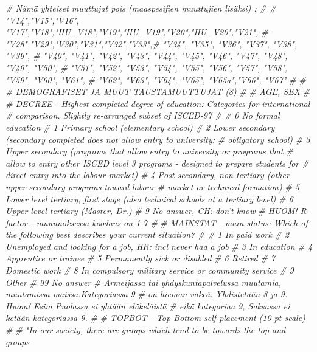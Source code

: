 \documentclass[
  finnish,
]{book}
\newenvironment{Shaded}{\begin{snugshade}}{\end{snugshade}}
\newcommand{\CommentTok}[1]{\textcolor[rgb]{0.56,0.35,0.01}{\textit{#1}}}
\begin{document}
\begin{Shaded}
\begin{Highlighting}[]
{\CommentTok{# Nämä yhteiset muuttujat pois (maaspesifien muuttujien lisäksi) :}
\CommentTok{#}
\CommentTok{# "V14","V15","V16",  "V17","V18","HU_V18","V19","HU_V19","V20","HU_V20","V21",}
\CommentTok{# "V28","V29","V30","V31","V32","V33",# "V34", "V35", "V36", "V37", "V38", "V39",}
\CommentTok{# "V40", "V41", "V42", "V43", "V44", "V45", "V46", "V47", "V48", "V49", "V50", }
\CommentTok{# "V51", "V52", "V53", "V54", "V55", "V56", "V57", "V58", "V59", "V60", "V61", }
\CommentTok{# "V62", "V63", "V64", "V65", "V65a","V66", "V67"}
\CommentTok{#}
\CommentTok{#}
\CommentTok{# DEMOGRAFISET JA MUUT TAUSTAMUUTTUJAT (8)}
\CommentTok{#}
\CommentTok{# AGE, SEX}
\CommentTok{#}
\CommentTok{# DEGREE - Highest completed degree of education: Categories for international}
\CommentTok{# comparison. Slightly re-arranged subset of ISCED-97}
\CommentTok{#}
\CommentTok{# 0 No formal education}
\CommentTok{# 1 Primary school (elementary school)}
\CommentTok{# 2 Lower secondary (secondary completed does not allow entry to university:}
\CommentTok{#  obligatory school)}
\CommentTok{# 3 Upper secondary (programs that allow entry to university or programs that}
\CommentTok{#  allow to entry other ISCED level 3 programs - designed to prepare students for}
\CommentTok{#  direct entry into the labour market)}
\CommentTok{# 4 Post secondary, non-tertiary (other upper secondary programs toward labour}
\CommentTok{#  market or technical formation)}
\CommentTok{# 5 Lower level tertiary, first stage (also technical schools at a tertiary level)}
\CommentTok{# 6 Upper level tertiary (Master, Dr.)}
\CommentTok{# 9 No answer, CH: don't know}
\CommentTok{# HUOM! R-factor - muunnoksessa koodaus on 1-7}
\CommentTok{#}
\CommentTok{# MAINSTAT - main status: Which of the following best describes your current situation?}
\CommentTok{#}
\CommentTok{# 1 In paid work}
\CommentTok{# 2 Unemployed and looking for a job, HR: incl never had a job}
\CommentTok{# 3 In education}
\CommentTok{# 4 Apprentice or trainee}
\CommentTok{# 5 Permanently sick or disabled}
\CommentTok{# 6 Retired}
\CommentTok{# 7 Domestic work}
\CommentTok{# 8 In compulsory military service or community service}
\CommentTok{# 9 Other}
\CommentTok{# 99 No answer}
\CommentTok{# Armeijassa tai yhdyskuntapalvelussa muutamia, muutamissa maissa.Kategoriassa 9 }
\CommentTok{# on hieman väkeä. Yhdistetään 8 ja 9. Huom! Esim Puolassa ei yhtään eläkeläistä}
\CommentTok{# eikä kategoriaa 9, Saksassa ei ketään kategoriassa 9.}
\CommentTok{#}
\CommentTok{# TOPBOT - Top-Bottom self-placement (10 pt scale)}
\CommentTok{#}
\CommentTok{# "In our society, there are groups which tend to be towards the top and groups }
}
\end{Highlighting}
\end{Shaded}
\end{document}
